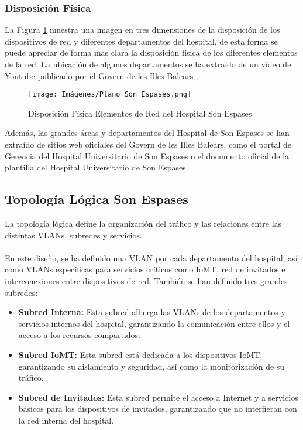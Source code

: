 \subsubsection{Disposición Física}
\label{subsubsec:dispsoicion}
La Figura \ref{fig:disposicion} muestra una imagen en tres dimensiones de la disposición de los dispositivos de red y diferentes departamentos del hospital, de esta forma se puede apreciar 
de forma mas clara la disposición física de los diferentes elementos de la red. La ubicación de algunos departamentos se ha extraído de un vídeo de Youtube publicado por el Govern de les Illes Balears \cite{SonEspases}.
\begin{figure}[H]
    \centering
    \texttt{[image: Imágenes/Plano Son Espases.png]}
    \caption{Disposición Física Elementos de Red del Hospital Son Espases}
    \label{fig:disposicion}
\end{figure}
Además, las grandes áreas y departamentos del Hospital de Son Espases se han extraído de sitios web oficiales del Govern de les Illes Balears, como el portal de Gerencia del Hospital Universitario de Son Espases 
\cite{GerenciaSonEspases} o el documento oficial de la plantilla del Hospital Universitario de Son Espases \cite{PlantillaSonEspases}.

\subsection{Topología Lógica Son Espases}

La topología lógica define la organización del tráfico y las relaciones entre las distintas VLANs, subredes y servicios.
\\ \\
En este diseño, se ha definido una VLAN por cada departamento del hospital, así como VLANs específicas para servicios críticos como IoMT, red de invitados e interconexiones entre dispositivos de red. También se han definido tres grandes subredes:
\begin{itemize}
    \item \textbf{Subred Interna:} Esta subred alberga las VLANs de los departamentos y servicios internos del hospital, garantizando la comunicación entre ellos y el acceso a los recursos compartidos.
    \item \textbf{Subred IoMT:} Esta subred está dedicada a los dispositivos IoMT, garantizando su aislamiento y seguridad, así como la monitorización de su tráfico.
    \item \textbf{Subred de Invitados:} Esta subred permite el acceso a Internet y a servicios básicos para los dispositivos de invitados, garantizando que no interfieran con la red interna del hospital.
\end{itemize}


